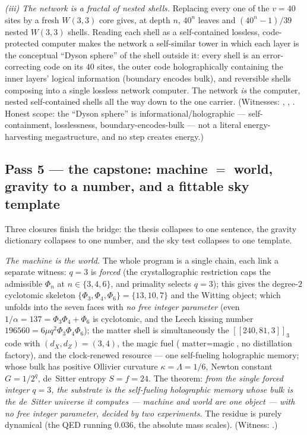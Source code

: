 \documentclass[11pt]{article}
\begin{document}
\emph{(iii) The network is a fractal of nested shells.} Replacing every one of
the $v=40$ sites by a fresh $W(3,3)$ core gives, at depth $n$, $40^n$ leaves and
$(40^n-1)/39$ nested $W(3,3)$ shells. Reading each shell as a self-contained
lossless, code-protected computer makes the network a self-similar tower in which
each layer is the conceptual ``Dyson sphere'' of the shell outside it: every
shell is an error-correcting code on its $40$ sites, the outer code holographically
containing the inner layers' logical information (boundary encodes bulk), and
reversible shells composing into a single lossless network computer. The network
\emph{is} the computer, nested self-contained shells all the way down to the one
carrier. (Witnesses: ,
,
. Honest scope: the
``Dyson sphere'' is informational/holographic --- self-containment, losslessness,
boundary-encodes-bulk --- not a literal energy-harvesting megastructure, and no
step creates energy.)

\subsection{Pass 5 --- the capstone: machine $=$ world, gravity to a number, and a fittable sky template}
\label{sec:capstone}

Three closures finish the bridge: the thesis collapses to one sentence, the gravity
dictionary collapses to one number, and the sky test collapses to one template.

\emph{The machine is the world.} The whole program is a single chain, each link a
separate witness: $q=3$ is \emph{forced} (the crystallographic restriction caps the
admissible $\Phi_n$ at $n\in\{3,4,6\}$, and primality selects $q=3$); this gives the
degree-$2$ cyclotomic skeleton $\{\Phi_3,\Phi_4,\Phi_6\}=\{13,10,7\}$ and the Witting
object; which unfolds into the seven faces with \emph{no free integer parameter} (even
$1/\alpha=137=\Phi_3\Phi_4+\Phi_6$ is cyclotomic, and the Leech kissing number
$196560=6\mu q^2\Phi_3\Phi_4\Phi_6$); the matter shell is simultaneously the
$[[240,81,3]]_3$ code with $(d_X,d_Z)=(3,4)$, the magic fuel
($\text{matter}=\text{magic}$, no distillation
factory), and the clock-renewed resource --- one self-fueling holographic memory; whose
bulk has positive Ollivier curvature $\kappa=\Lambda=1/6$, Newton constant $G=1/2^q$,
de~Sitter entropy $S=f=24$. The theorem: \emph{from the single forced integer $q=3$,
the substrate is the self-fueling holographic memory whose bulk is the de~Sitter
universe it computes --- machine and world are one object --- with no free integer
parameter, decided by two experiments.} The residue is purely dynamical (the QED running
$0.036$, the absolute mass scales). (Witness: .)
\end{document}
